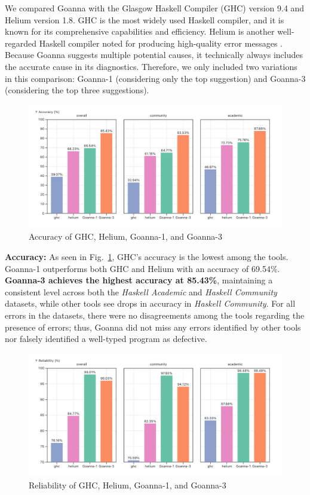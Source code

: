 \documentclass[pdflatex,lineno,sn-nature,Numbered]{sn-jnl}%
\begin{document}
We compared Goanna with the Glasgow Haskell Compiler (GHC) version 9.4 \cite{Gamari_undated-zu} and Helium \cite{Hage2023-kk} version 1.8. GHC is the most widely used Haskell compiler, and it is known for its comprehensive capabilities and efficiency. Helium is another well-regarded Haskell compiler noted for producing high-quality error messages \cite{Heeren2003-kd}. Because Goanna suggests multiple potential causes, it technically always includes the accurate cause in its diagnostics. Therefore, we only included two variations in this comparison: Goanna-1 (considering only the top suggestion) and Goanna-3 (considering the top three suggestions).

    \begin{figure}
        \centering
        \includegraphics[width=\linewidth]{images/accuracy.png}
        \caption{Accuracy of GHC, Helium, Goanna-1, and Goanna-3} 
        \label{fig:accuracy}
    \end{figure}


\textbf{Accuracy:} As seen in Fig.~\ref{fig:accuracy}, GHC's accuracy is the lowest among the tools. Goanna-1 outperforms both GHC and Helium with an accuracy of 69.54\%. \textbf{Goanna-3 achieves the highest accuracy at 85.43\%}, maintaining a consistent level across both the \textit{Haskell Academic} and \textit{Haskell Community} datasets, while other tools see drops in accuracy in \textit{Haskell Community}. For all errors in the datasets, there were no disagreements among the tools regarding the presence of errors; thus, Goanna did not miss any errors identified by other tools nor falsely identified a well-typed program as defective.

    \begin{figure}
        \centering
        \includegraphics[width=\linewidth]{images/Reliability.png}
        \caption{Reliability of GHC, Helium, Goanna-1, and Goanna-3}
        \label{fig:reliability}
    \end{figure}
\end{document}
